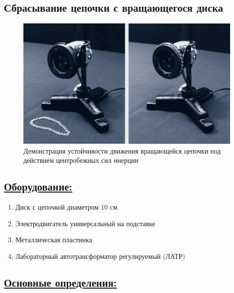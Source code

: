 \documentclass[14pt,a4paper,twoside]{extarticle}	%
\begin{document}
	
\newpage
\begin{center}
	\subsection*{Сбрасывание цепочки с вращающегося диска}
\end{center}
		
\begin{figure}[H] 	
	\centering 	
		\includegraphics[width=0.9\linewidth]{chain-1.png}
		\caption{Демонстрация устойчивости движения вращающейся цепочки под действием центробежных сил инерции}
		\label{chain-1}
	\end{figure}
		
		\subsection*{\underline{Оборудование:}}
		
		\begin{enumerate}
			\item Диск с цепочкой диаметром 10 см
			\item Электродвигатель универсальный на подставке
			\item Металлическая пластинка
			\item Лабораторный автотрансформатор регулируемый (ЛАТР)
		\end{enumerate}
		
		\subsection*{\underline{Основные определения:}}
		
\end{document}

